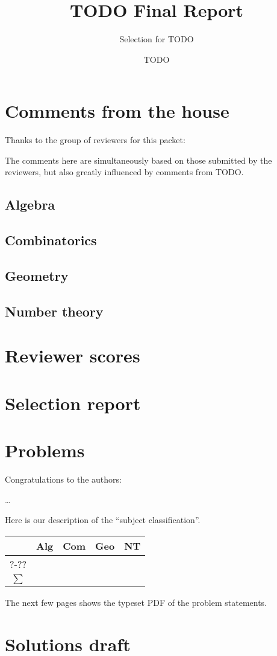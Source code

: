 \documentclass[11pt]{scrreprt}
\begin{document}
\title{TODO Final Report}
\subtitle{Selection for TODO}
\author{TODO}
\maketitle

\tableofcontents

\chapter{Comments from the house}
Thanks to the group of reviewers for this packet:



The comments here are simultaneously
based on those submitted by the reviewers,
but also greatly influenced by comments from TODO.

\section{Algebra}
\section{Combinatorics}
\section{Geometry}
\section{Number theory}
\chapter{Reviewer scores}
\setlength\tabcolsep{5pt}


\chapter{Selection report}
\chapter{Problems}
Congratulations to the authors:
\begin{description}
  \ii[\dots] \dots
\end{description}

Here is our description of the ``subject classification''.


\begin{center}
  \begin{tabular}[h]{c rrrr}
    \toprule
    & Alg & Com & Geo & NT \\
    \midrule
    ?-?? &      &      &      &      \\
    \midrule
    $\sum$  &      &      &      &      \\
    \bottomrule
  \end{tabular}
\end{center}

The next few pages
shows the typeset PDF of the problem statements.

% 
% 

\chapter{Solutions draft}
\end{document}
